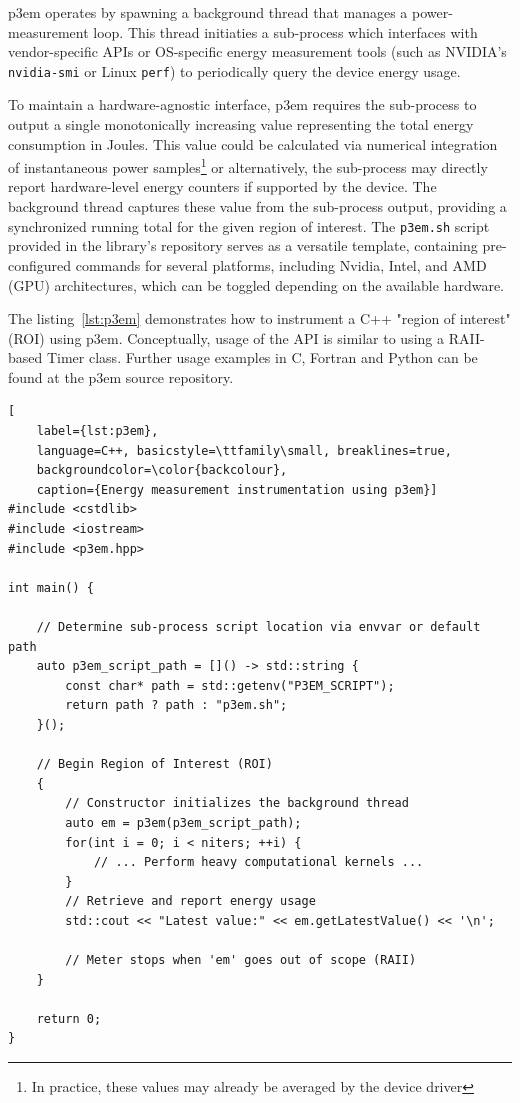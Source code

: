 \documentclass[a4paper,12pt]{article}
\begin{document}
p3em operates by spawning a background thread that manages a power-measurement loop.
This thread initiaties a sub-process which interfaces with vendor-specific APIs or
OS-specific energy measurement tools (such as NVIDIA's \texttt{nvidia-smi} or Linux \texttt{perf})
to periodically query the device energy usage.

To maintain a hardware-agnostic interface, p3em requires the sub-process to
output a single monotonically increasing value representing the total energy
consumption in Joules.
This value could be calculated via numerical integration
of instantaneous power samples\footnote{In practice, these values may already be averaged by the device driver}
or alternatively, the sub-process may directly report hardware-level energy
counters if supported by the device.
The background thread captures these value from the sub-process output,
providing a synchronized running total for the given region of interest.
The \texttt{p3em.sh} script provided in the library's repository serves
as a versatile template, containing pre-configured commands for several
platforms, including Nvidia, Intel, and AMD (GPU) architectures,
which can be toggled depending on the available hardware.

The listing~\ref{lst:p3em} demonstrates how to instrument a C++ "region of interest" (ROI)
using p3em. Conceptually, usage of the API is similar to using a RAII-based Timer class.
Further usage examples in C, Fortran and Python can be found at the p3em source repository.

\begin{lstlisting}[
    label={lst:p3em},
    language=C++, basicstyle=\ttfamily\small, breaklines=true,
    backgroundcolor=\color{backcolour},
    caption={Energy measurement instrumentation using p3em}]
#include <cstdlib>
#include <iostream>
#include <p3em.hpp>

int main() {

    // Determine sub-process script location via envvar or default path
    auto p3em_script_path = []() -> std::string {
        const char* path = std::getenv("P3EM_SCRIPT");
        return path ? path : "p3em.sh";
    }();

    // Begin Region of Interest (ROI)
    {
        // Constructor initializes the background thread
        auto em = p3em(p3em_script_path);
        for(int i = 0; i < niters; ++i) {
            // ... Perform heavy computational kernels ...
        }
        // Retrieve and report energy usage
        std::cout << "Latest value:" << em.getLatestValue() << '\n';

        // Meter stops when 'em' goes out of scope (RAII)
    }

    return 0;
}
\end{lstlisting}
\end{document}
